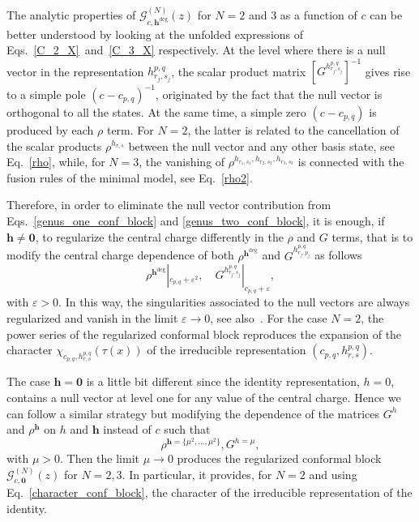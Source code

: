 \documentclass[a4paper,11pt]{article}
\begin{document}
The analytic properties of $\mathcal{G}_{c, \boldsymbol{h}^{\text{deg}}}^{(N)}(z)$ for $N=2$ and $3$ as a function of $c$ can be better understood by looking at the unfolded expressions of Eqs.~\eqref{C_2_X}~and~\eqref{C_3_X} respectively. At the level where there is a null vector in the representation $h_{r_j, s_j}^{p, q}$, the scalar product matrix $\left[G^{h^{p,q}_{r_j,s_j}}\right]^{-1}$ gives rise to a simple pole $(c-c_{p, q})^{-1}$, originated by the fact that the null vector is orthogonal to all the states.  At the same time, a simple zero $(c-c_{p,q})$ is produced by each $\rho$ term. For $N=2$, the latter is related to the cancellation of the scalar products $\rho^{h_{r,s}}$ between the null vector and any other basis state, see Eq.~\eqref{rho}, while, for $N= 3$, the vanishing of $\rho^{h_{r_1,s_1},h_{r_2,s_2},h_{r_3,s_3}}$ is connected with the fusion rules of the minimal model, see Eq.~\eqref{rho2}.  

Therefore, in order to eliminate the null vector contribution from Eqs.~\eqref{genus_one_conf_block} and \eqref{genus_two_conf_block}, 
it is enough, if $\boldsymbol{h}\neq \boldsymbol{0}$, to regularize the central charge differently in the $\rho$ and $G$ terms, 
that is to modify the central charge dependence of both $\rho^{\boldsymbol{h}^{\text{deg}}}$ and $G^{h_{r_j, p_j}^{p, q}}$ as follows
\begin{equation}\label{regularization}
 \rho^{\boldsymbol{h}^{\text{deg}}}|_{c_{p,q}+\varepsilon^2},\quad  G^{h_{r_j, s_j}^{p, q}}|_{c_{p,q}+\varepsilon},
\end{equation}
with $\varepsilon>0$. In this way, the singularities associated to the null vectors are always regularized and vanish 
in the limit $\varepsilon\to 0$, see also~\cite{Javerzar, SV}. For the case $N=2$, the power series of the regularized
conformal block reproduces the expansion of the character $\chi_{c_{p, q}, h_{r, s}^{p, q}}(\tau(x))$ of the irreducible 
representation $(c_{p, q}, h_{r, s}^{p, q})$.

The case $\boldsymbol{h}=\boldsymbol{0}$ is a little bit different since the identity representation,
$h=0$, contains a null vector at level one for any value of the central charge. Hence we can follow 
a similar strategy but modifying the dependence of the matrices $G^{h}$ and $\rho^{\boldsymbol{h}}$
on $h$ and $\boldsymbol{h}$ instead of $c$ such that
\begin{equation}\label{regularization_identity}
 \rho^{\boldsymbol{h}=\{\mu^2,\dots, \mu^2\}}, G^{h=\mu},
\end{equation}
with $\mu>0$. Then the limit $\mu\to 0$ produces the regularized conformal block 
$\mathcal{G}_{c, \boldsymbol{0}}^{(N)}(z)$ for $N=2,3$. In particular, it provides, 
for $N=2$ and using Eq.~\eqref{character_conf_block}, the  character of the irreducible 
representation of the identity.
\end{document}
